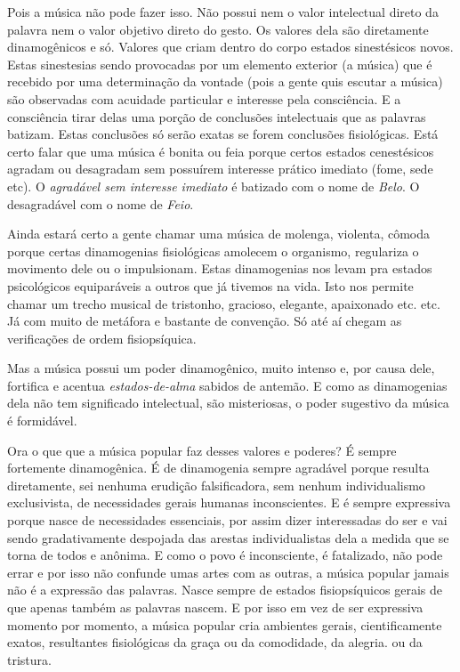 Pois a música não pode fazer isso. Não possui nem o valor intelectual
direto da palavra nem o valor objetivo direto do gesto. Os valores dela
são diretamente dinamogênicos e só. Valores que criam dentro do corpo
estados sinestésicos novos. Estas sinestesias sendo provocadas por um
elemento exterior (a música) que é recebido por uma determinação da
vontade (pois a gente quis escutar a música) são observadas com acuidade
particular e interesse pela consciência. E a consciência tirar delas uma
porção de conclusões intelectuais que as palavras batizam. Estas
conclusões só serão exatas se forem conclusões fisiológicas. Está certo
falar que uma música é bonita ou feia porque certos estados cenestésicos
agradam ou desagradam sem possuírem interesse prático imediato (fome,
sede etc). O \textit{agradável sem interesse imediato} é batizado com o nome de
\textit{Belo}. O desagradável com o nome de \textit{Feio}.

Ainda estará certo a gente chamar uma música de molenga, violenta,
cômoda porque certas dinamogenias fisiológicas amolecem o organismo,
regulariza o movimento dele ou o impulsionam. Estas dinamogenias nos
levam pra estados psicológicos equiparáveis a outros que já tivemos na
vida. Isto nos permite chamar um trecho musical de tristonho, gracioso,
elegante, apaixonado etc. etc. Já com muito de metáfora e bastante de
convenção. Só até aí chegam as verificações de ordem fisiopsíquica.

Mas a música possui um poder dinamogênico, muito intenso e, por causa
dele, fortifica e acentua \textit{estados-de-alma} sabidos de antemão. E
como as dinamogenias dela não tem significado intelectual, são
misteriosas, o poder sugestivo da música é formidável.

Ora o que que a música popular faz desses valores e poderes? É sempre
fortemente dinamogênica. É de dinamogenia sempre agradável porque
resulta diretamente, sei nenhuma erudição falsificadora, sem nenhum
individualismo exclusivista, de necessidades gerais humanas
inconscientes. E é sempre expressiva porque nasce de necessidades
essenciais, por assim dizer interessadas do ser e vai sendo
gradativamente despojada das arestas individualistas dela a medida que
se torna de todos e anônima. E como o povo é inconsciente, é fatalizado,
não pode errar e por isso não confunde umas artes com as outras, a
música popular jamais não é a expressão das palavras. Nasce sempre de
estados fisiopsíquicos gerais de que apenas também as palavras
nascem. E por isso em vez de ser expressiva momento por momento, a
música popular cria ambientes gerais, cientificamente exatos,
resultantes fisiológicas da graça ou da comodidade, da alegria. ou da
tristura.

